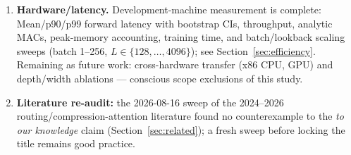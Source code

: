 \begin{enumerate}
  \item \textbf{Hardware/latency.} Development-machine measurement is complete:
        Mean/p90/p99 forward latency with bootstrap
        CIs, throughput, analytic MACs, peak-memory accounting, training
        time, and batch/lookback scaling sweeps (batch 1--256,
        $L \in \{128, \dots, 4096\}$); see Section~\ref{sec:efficiency}.
        Remaining as future work: cross-hardware transfer (x86 CPU, GPU)
        and depth/width ablations --- conscious scope exclusions of this
        study.
  \item \textbf{Literature re-audit:} the 2026-08-16 sweep of the
        2024--2026 routing/compression-attention literature found no
        counterexample to the \emph{to our knowledge} claim
        (Section~\ref{sec:related}); a fresh sweep before locking the
        title remains good practice.
\end{enumerate}
